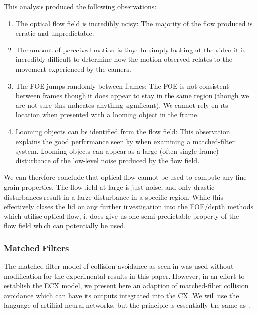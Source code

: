 \documentclass[a4paper,11pt,twoside,openright]{article}
\begin{document}
This analysis produced the following observations:
\begin{enumerate}
\item{
  The optical flow field is incredibly noisy: The majority of the flow produced
  is erratic and unpredictable.
}

\item{
  The amount of perceived motion is tiny: In simply looking at the video it is
  incredibly difficult to determine how the motion observed relates to the
  movement experienced by the camera.
}

\item{
  The FOE jumps randomly between frames: The FOE is not consistent between frames
  though it does appear to stay in the same region (though we are not sure this
  indicates anything significant). We cannot rely on its location when presented
  with a looming object in the frame.
}

\item{
  Looming objects can be identified from the flow field: This observation
  explains the good performance seen by \cite{Mitchell2018} when examining
  a matched-filter system. Looming objects can appear as a large (often single
  frame) disturbance of the low-level noise produced by the flow field.
}
\end{enumerate}

We can therefore conclude that optical flow cannot be used to compute any
fine-grain properties. The flow field at large is just noise, and only drastic
disturbances result in a large disturbance in a specific region. While this
effectively closes the lid on any further investigation into the FOE/depth
methods which utilise optical flow, it does give us one semi-predictable property
of the flow field which can potentially be used.

\subsubsection{Matched Filters}
The matched-filter model of collision avoidance as seen in \cite{Mitchell2018}
was used without modification for the experimental results in this paper.
However, in an effort to establish the ECX model, we present here an adaption of
matched-filter collision avoidance which can have its outputs integrated into the
CX. We will use the language of artifiial neural networks, but the principle is
essentially the same as \cite{Mitchell2018}.
\newline\par
\end{document}
